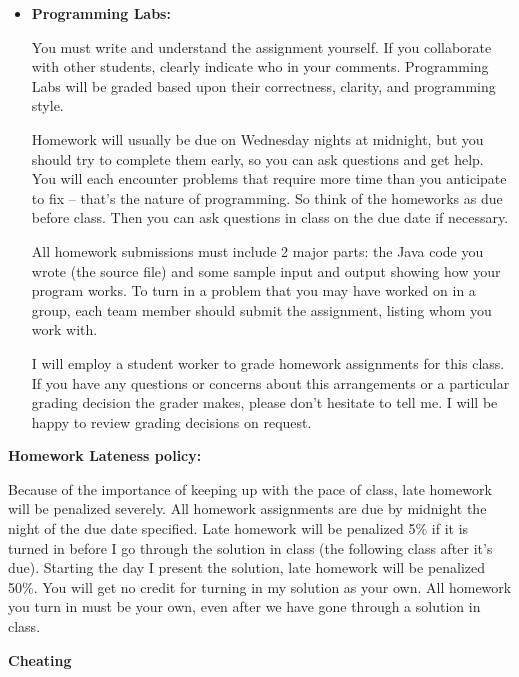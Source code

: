 \documentclass[11pt]{article}
\begin{document}
\begin{itemize}
	\item \textbf {Programming Labs:}

          You must write and understand the assignment yourself. If you collaborate with other students, clearly indicate who in your comments. Programming Labs will be graded based upon their correctness, clarity, and programming style.

          Homework will usually be due on Wednesday nights at midnight, but you should try to complete them early, so you can ask questions and get help. You will each encounter problems that require more time than you anticipate to fix -- that's the nature of programming. So think of the homeworks as due before class. Then you can ask questions in class on the due date if necessary.

          All homework submissions must include 2 major parts: the Java code you wrote (the source file) and some sample input and output showing how your program works. To turn in a problem that you may have worked on in a group, each team member should submit the assignment, listing whom you work with.

          I will employ a student worker to grade homework assignments for this class. If you have any questions or concerns about this arrangements or a particular grading decision the grader makes, please don't hesitate to tell me. I will be happy to review grading decisions on request.

\end{itemize}

\textbf {Homework Lateness policy:}

\hspace{3mm}

        Because of the importance of keeping up with the pace of class, late
        homework will be penalized severely. All homework assignments are due
        by midnight the night of the due date specified. Late homework will be
        penalized 5\% if it is turned in before I go through the solution in
        class (the following class after it's due). Starting the day I present
        the solution, late homework will be penalized 50\%. You will get no
        credit for turning in my solution as your own. All homework you turn in
        must be your own, even after we have gone through a solution in class.

\hspace{3mm}

\textbf{Cheating}
\end{document}
